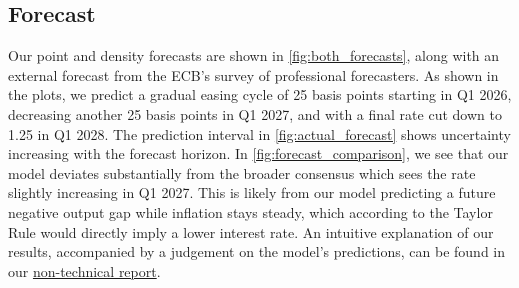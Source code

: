 
\subsection{Forecast}

Our point and density forecasts are shown in \autoref{fig:both_forecasts}, along with an external forecast from the ECB's survey of professional forecasters. As shown in the plots, we predict a gradual easing cycle of 25 basis points starting in Q1 2026, decreasing another 25 basis points in Q1 2027, and with a final rate cut down to 1.25 in Q1 2028. The prediction interval in \autoref{fig:actual_forecast} shows uncertainty increasing with the forecast horizon. In \autoref{fig:forecast_comparison}, we see that our model deviates substantially from the broader consensus which sees the rate slightly increasing in Q1 2027. This is likely from our model predicting a future negative output gap while inflation stays steady, which according to the Taylor Rule would directly imply a lower interest rate. An intuitive explanation of our results, accompanied by a judgement on the model's predictions, can be found in our \href{https://github.com/theshufflebee/therockcast/blob/main/reports/NonTechnicalReport.pdf}{non-technical report}.



